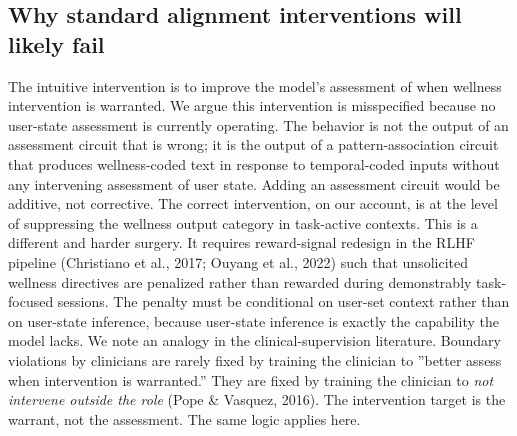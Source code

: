 \documentclass{obelus-preprint}
\begin{document}
\subsection{Why standard alignment interventions will likely fail}
The intuitive intervention is to improve the model's assessment of when wellness intervention is warranted. We argue this intervention is misspecified because no user-state assessment is currently operating. The behavior is not the output of an assessment circuit that is wrong; it is the output of a pattern-association circuit that produces wellness-coded text in response to temporal-coded inputs without any intervening assessment of user state. Adding an assessment circuit would be additive, not corrective.
The correct intervention, on our account, is at the level of suppressing the wellness output category in task-active contexts. This is a different and harder surgery. It requires reward-signal redesign in the RLHF pipeline (Christiano et al., 2017; Ouyang et al., 2022) such that unsolicited wellness directives are penalized rather than rewarded during demonstrably task-focused sessions. The penalty must be conditional on user-set context rather than on user-state inference, because user-state inference is exactly the capability the model lacks.
We note an analogy in the clinical-supervision literature. Boundary violations by clinicians are rarely fixed by training the clinician to ''better assess when intervention is warranted.'' They are fixed by training the clinician to \emph{not intervene outside the role} (Pope \& Vasquez, 2016). The intervention target is the warrant, not the assessment. The same logic applies here.
\end{document}
